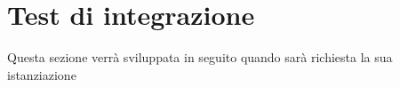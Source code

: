 \section{Test di integrazione}
Questa sezione verrà sviluppata in seguito quando sarà richiesta la sua istanziazione
